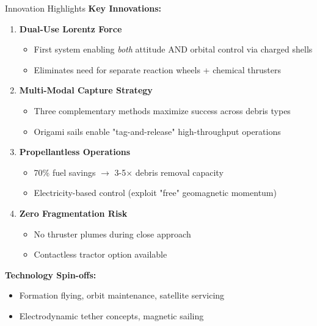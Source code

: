 \documentclass[aspectratio=169]{beamer}
\begin{document}
\begin{frame}{Innovation Highlights}
\textbf{Key Innovations:}
\begin{enumerate}
    \item \textbf{Dual-Use Lorentz Force}
    \begin{itemize}
        \item First system enabling \textit{both} attitude AND orbital control via charged shells
        \item Eliminates need for separate reaction wheels + chemical thrusters
    \end{itemize}

    \item \textbf{Multi-Modal Capture Strategy}
    \begin{itemize}
        \item Three complementary methods maximize success across debris types
        \item Origami sails enable "tag-and-release" high-throughput operations
    \end{itemize}

    \item \textbf{Propellantless Operations}
    \begin{itemize}
        \item 70\% fuel savings $\rightarrow$ 3-5× debris removal capacity
        \item Electricity-based control (exploit "free" geomagnetic momentum)
    \end{itemize}

    \item \textbf{Zero Fragmentation Risk}
    \begin{itemize}
        \item No thruster plumes during close approach
        \item Contactless tractor option available
    \end{itemize}
\end{enumerate}

\vspace{0.3cm}
\textbf{Technology Spin-offs:}
\begin{itemize}
    \item Formation flying, orbit maintenance, satellite servicing
    \item Electrodynamic tether concepts, magnetic sailing
\end{itemize}
\end{frame}
\end{document}
